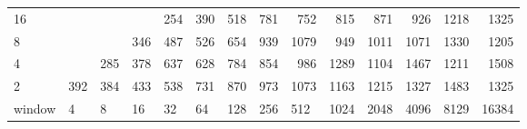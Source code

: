 \begin{table}[h]
{\begin{tabular}{lrrrrrrrrrrrrr}
			\multicolumn{1}{|l|}{16} &  &  &  & \cellcolor[HTML]{99E600}254 & \cellcolor[HTML]{99E600}390 & \cellcolor[HTML]{E69900}518 & \cellcolor[HTML]{E60000}781 & \cellcolor[HTML]{E60000}752 & \cellcolor[HTML]{E60000}815 & \cellcolor[HTML]{E60000}871 & \cellcolor[HTML]{E60000}926 & \cellcolor[HTML]{9900E6}1218 & \cellcolor[HTML]{9900E6}1325 \\ \cline{1-1}
			\multicolumn{1}{|l|}{8} &  &  & \cellcolor[HTML]{99E600}346 & \cellcolor[HTML]{E69900}487 & \cellcolor[HTML]{E69900}526 & \cellcolor[HTML]{E69900}654 & \cellcolor[HTML]{E60000}939 & \cellcolor[HTML]{9900E6}1079 & \cellcolor[HTML]{E60000}949 & \cellcolor[HTML]{9900E6}1011 & \cellcolor[HTML]{9900E6}1071 & \cellcolor[HTML]{9900E6}1330 & \cellcolor[HTML]{9900E6}1205 \\ \cline{1-1}
			\multicolumn{1}{|l|}{4} &  & \cellcolor[HTML]{99E600}285 & \cellcolor[HTML]{99E600}378 & \cellcolor[HTML]{E69900}637 & \cellcolor[HTML]{E69900}628 & \cellcolor[HTML]{E60000}784 & \cellcolor[HTML]{E60000}854 & \cellcolor[HTML]{9900E6}986 & \cellcolor[HTML]{9900E6}1289 & \cellcolor[HTML]{9900E6}1104 & \cellcolor[HTML]{4C00E6}1467 & \cellcolor[HTML]{9900E6}1211 & \cellcolor[HTML]{4C00E6}1508 \\ \cline{1-1}
			\multicolumn{1}{|l|}{2} & \cellcolor[HTML]{99E600}392 & \cellcolor[HTML]{99E600}384 & \cellcolor[HTML]{99E600}433 & \cellcolor[HTML]{E69900}538 & \cellcolor[HTML]{E60000}731 & \cellcolor[HTML]{E60000}870 & \cellcolor[HTML]{9900E6}973 & \cellcolor[HTML]{9900E6}1073 & \cellcolor[HTML]{9900E6}1163 & \cellcolor[HTML]{9900E6}1215 & \cellcolor[HTML]{4C00E6}1327 & \cellcolor[HTML]{4C00E6}1483 & \cellcolor[HTML]{4C00E6}1325 \\ \cline{1-1}
			\multicolumn{1}{l|}{window} & \multicolumn{1}{l|}{4} & \multicolumn{1}{l|}{8} & \multicolumn{1}{l|}{16} & \multicolumn{1}{l|}{32} & \multicolumn{1}{l|}{64} & \multicolumn{1}{l|}{128} & \multicolumn{1}{l|}{256} & \multicolumn{1}{l|}{512} & \multicolumn{1}{l|}{1024} & \multicolumn{1}{l|}{2048} & \multicolumn{1}{l|}{4096} & \multicolumn{1}{l|}{8129} & \multicolumn{1}{l|}{16384} \\ \cline{2-14}
		\end{tabular}
	}
\end{table}


